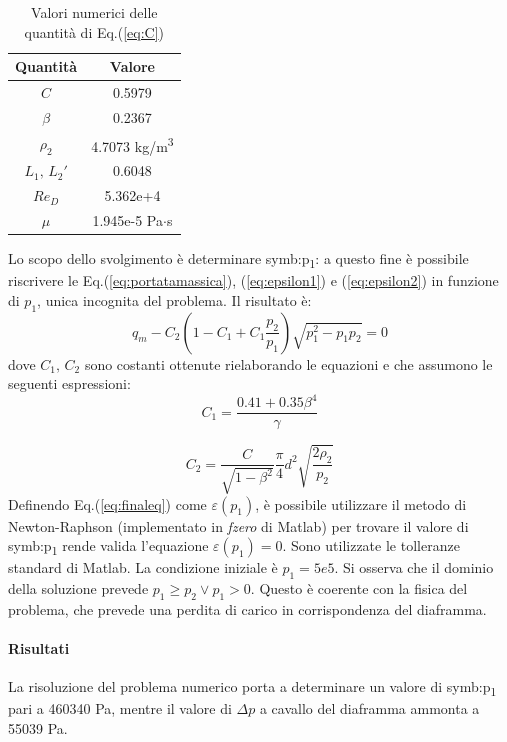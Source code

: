 \begin{table}[H]
	\centering
	\begin{tabular}{c|c}
		\toprule
		\toprule
		\textbf{Quantità} & \textbf{Valore}\\
		\midrule
		\midrule
		$C$ & 0.5979\\
		\midrule
		$\beta$ & 0.2367\\
		\midrule
		$\rho_2$ & 4.7073 kg/m\textsuperscript{3}\\
		\midrule
		$L_1,\,L_2'$ & 0.6048\\
		\midrule
		$Re_D$ & 5.362e+4\\
		\midrule
		$\mu$ & 1.945e-5 Pa$\cdot$s\\
		\bottomrule
		\bottomrule
	\end{tabular}
\caption{Valori numerici delle quantità di Eq.(\ref{eq:C})}
\label{tab:valoriC}
\end{table}

Lo scopo dello svolgimento è determinare \gls{symb:p}\textsubscript{1}: a questo fine è possibile riscrivere le Eq.(\ref{eq:portatamassica}), (\ref{eq:epsilon1}) e (\ref{eq:epsilon2}) in funzione di $p_1$, unica incognita del problema. 
Il risultato è:
\begin{equation}
	q_m-C_2(1-C_1+C_1 \frac{p_2}{p_1}) \sqrt{p_1^2-p_1 p_2}=0 \label{eq:finaleq}
\end{equation}
dove $ C_1,\, C_2$ sono costanti ottenute rielaborando le equazioni e che assumono le seguenti espressioni:
\begin{equation}
	C_1 = \frac{0.41 + 0.35 \beta^4}{\gamma}
\end{equation}

\begin{equation}
		C_2 = \frac{C}{\sqrt{1-\beta^2}} \frac{\pi}{4} d^2 \sqrt{\frac{2 \rho_2}{p_2}}
\end{equation}
Definendo Eq.(\ref{eq:finaleq}) come $\varepsilon (p_1) $, è possibile utilizzare il metodo di Newton-Raphson (implementato in \textit{fzero} di Matlab) per trovare il valore di \gls{symb:p}\textsubscript{1} rende valida l'equazione $\varepsilon (p_1) = 0$. Sono utilizzate le tolleranze standard di Matlab. La condizione iniziale è $p_1 = 5e5$. Si osserva che il dominio della soluzione prevede $p_1 \geqslant p_2 \vee p_1 > 0$. Questo è coerente con la fisica del problema, che prevede una perdita di carico in corrispondenza del diaframma. 

\paragraph{Risultati}
La risoluzione del problema numerico porta a determinare un valore di \gls{symb:p}\textsubscript{1} pari a 460340 Pa, mentre il valore di $\Delta p$ a cavallo del diaframma ammonta a 55039 Pa. 

